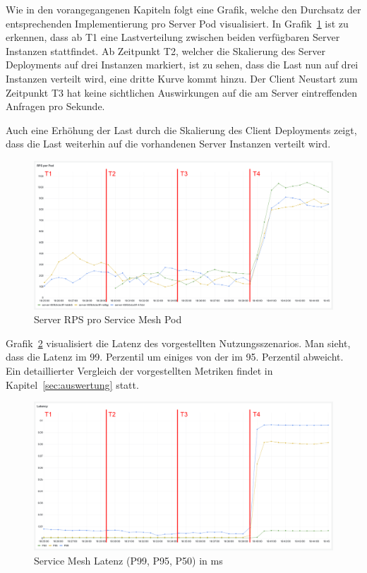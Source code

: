 Wie in den vorangegangenen Kapiteln folgt eine Grafik, welche den Durchsatz der entsprechenden Implementierung pro Server Pod visualisiert.
In Grafik~\ref{fig:mesh_rps} ist zu erkennen, dass ab T1 eine Lastverteilung zwischen beiden verfügbaren Server Instanzen stattfindet.
Ab Zeitpunkt T2, welcher die Skalierung des Server Deployments auf drei Instanzen markiert, ist zu sehen, dass die Last nun auf drei Instanzen verteilt wird, eine dritte Kurve kommt hinzu.
Der Client Neustart zum Zeitpunkt T3 hat keine sichtlichen Auswirkungen auf die am Server eintreffenden Anfragen pro Sekunde.

Auch eine Erhöhung der Last durch die Skalierung des Client Deployments zeigt, dass die Last weiterhin auf die vorhandenen Server Instanzen verteilt wird.

\begin{figure}[H]
    \centering
    \includegraphics[width=1\textwidth]{img/mesh_rps}
    \caption{Server RPS pro Service Mesh Pod}
    \label{fig:mesh_rps}
\end{figure}

Grafik~\ref{fig:mesh_latenz} visualisiert die Latenz des vorgestellten Nutzungsszenarios.
Man sieht, dass die Latenz im 99. Perzentil um einiges von der im 95. Perzentil abweicht.
Ein detaillierter Vergleich der vorgestellten Metriken findet in Kapitel~\ref{sec:auswertung} statt.

\begin{figure}[H]
    \centering
    \includegraphics[width=1\textwidth]{img/mesh_latenz}
    \caption{Service Mesh Latenz (P99, P95, P50) in ms}
    \label{fig:mesh_latenz}
\end{figure}

